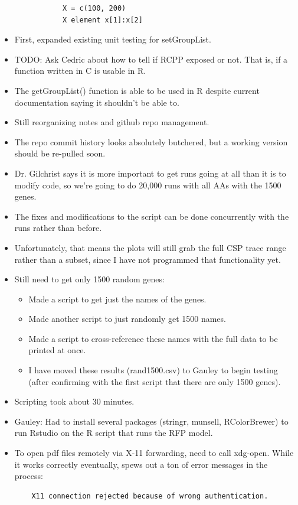 \documentclass[12pt,hyperref]{labbook}
\newcommand{\sep}{\discretionary{}{}{}} %
\begin{document}
\begin{itemize}
\begin{itemize}
\begin{lstlisting}
        X = c(100, 200)
        X element x[1]:x[2]
        \end{lstlisting}
    \end{itemize}
    \item First, expanded existing unit testing for set\sep Group\sep List.
    \item TODO: Ask Cedric about how to tell if RCPP exposed or not. That is, if a function written in C is usable in R.
    \item The getGroupList() function is able to be used in R despite current documentation saying it shouldn't be able to.
\end{itemize}


\begin{itemize}
    \item Still reorganizing notes and github repo management.
    \item The repo commit history looks absolutely butchered, but a working version should be re-pulled soon.
    \item Dr. Gilchrist says it is more important to get runs going at all than it is to modify code, so we're going to do 20,000 runs with all AAs with the 1500 genes.
    \item The fixes and modifications to the script can be done concurrently with the runs rather than before.
    \item Unfortunately, that means the plots will still grab the full CSP trace range rather than a subset, since I have not programmed that functionality yet.
    \item Still need to get only 1500 random genes:
    \begin{itemize}
        \item Made a script to get just the names of the genes.
        \item Made another script to just randomly get 1500 names.
        \item Made a script to cross-reference these names with the full data to be printed at once.
        \item I have moved these results (rand1500.csv) to Gauley to begin testing (after confirming with the first script that there are only 1500 genes).
    \end{itemize}
    \item Scripting took about 30 minutes.
    \item Gauley: Had to install several packages (stringr, munsell, RColorBrewer) to run Rstudio on the R script that runs the RFP model.
    \item To open pdf files remotely via X-11 forwarding, need to call xdg-open. 
    While it works correctly eventually, spews out a ton of error messages in the process:
    \begin{lstlisting}
    X11 connection rejected because of wrong authentication.


\end{lstlisting}
\end{itemize}
\end{document}
